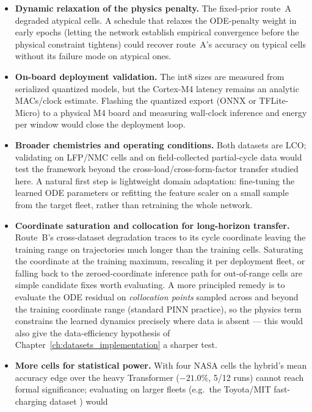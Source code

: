 \begin{itemize}
    \item \textbf{Dynamic relaxation of the physics penalty.} The fixed-prior
    route~A degraded atypical cells. A schedule that relaxes the ODE-penalty weight
    in early epochs (letting the network establish empirical convergence before the
    physical constraint tightens) could recover route~A's accuracy on typical cells
    without its failure mode on atypical ones.
    \item \textbf{On-board deployment validation.} The int8 sizes are measured
    from serialized quantized models, but the Cortex-M4 latency remains an
    analytic MACs/clock estimate. Flashing the quantized export (ONNX or
    TFLite-Micro) to a physical M4 board and measuring wall-clock inference and
    energy per window would close the deployment loop.
    \item \textbf{Broader chemistries and operating conditions.} Both datasets are
    LCO; validating on LFP/NMC cells and on field-collected partial-cycle data would
    test the framework beyond the cross-load/cross-form-factor transfer studied
    here. A natural first step is lightweight domain adaptation: fine-tuning the
    learned ODE parameters or refitting the feature scaler on a small sample from
    the target fleet, rather than retraining the whole network.
    \item \textbf{Coordinate saturation and collocation for long-horizon
    transfer.} Route~B's cross-dataset degradation traces to its cycle
    coordinate leaving the training range on trajectories much longer than the
    training cells. Saturating the coordinate at the training maximum,
    rescaling it per deployment fleet, or falling back to the
    zeroed-coordinate inference path for out-of-range cells are simple
    candidate fixes worth evaluating. A more principled remedy is to evaluate
    the ODE residual on \emph{collocation points} sampled across and beyond the
    training coordinate range (standard PINN practice), so the physics term
    constrains the learned dynamics precisely where data is absent --- this
    would also give the data-efficiency hypothesis of
    Chapter~\ref{ch:datasets_implementation} a sharper test.
    \item \textbf{More cells for statistical power.} With four NASA cells the
    hybrid's mean accuracy edge over the heavy Transformer ($-21.0\%$, 5/12
    runs) cannot reach formal significance; evaluating on larger fleets
    (e.g.\ the Toyota/MIT fast-charging dataset \cite{severson_data}) would

\end{itemize}

